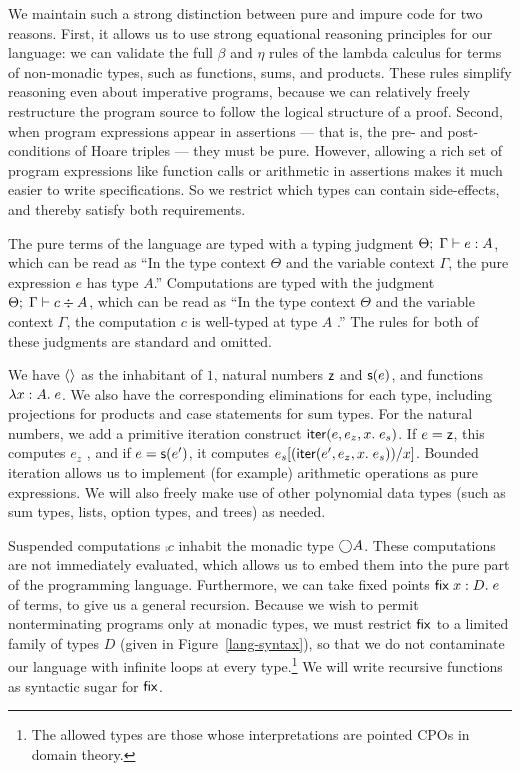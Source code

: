 \documentclass[preprint,natbib]{sigplanconf}
\begin{document}
We maintain such a strong distinction between pure and impure code for
two reasons. First, it allows us to use strong equational reasoning
principles for our language: we can validate the full $\beta$ and
$\eta$ rules of the lambda calculus for terms of non-monadic types,
such as functions, sums, and products. These rules simplify reasoning
even about imperative programs, because we can relatively freely
restructure the program source to follow the logical structure of a
proof. Second, when program expressions appear in assertions --- that
is, the pre- and post-conditions of Hoare triples --- they must be
pure. However, allowing a rich set of program expressions like
function calls or arithmetic in assertions makes it much easier to
write specifications. So we restrict which types can contain
side-effects, and thereby satisfy both requirements.

The pure terms of the language are typed with a typing judgment
${\Theta};\;{\Gamma} \vdash {e} : {A}$, which can be read as ``In the type context
$\Theta$ and the variable context $\Gamma$, the pure expression $e$
has type $A$.'' Computations are typed with the judgment
${\Theta};\;{\Gamma} \vdash {c} \div {A}$, which can be read as ``In the type context
$\Theta$ and the variable context $\Gamma$, the computation $c$ is
well-typed at type $A$ .'' The rules for both of these judgments are
standard and omitted.

We have $\left<\right>$ as the inhabitant of $1$, natural numbers $\mbox{\textsf{{z}}}$ and
$\mbox{\textsf{{s}}}(e)$, and functions $\lambda x:A.\;e$. We also have the corresponding
eliminations for each type, including projections for products and
case statements for sum types. For the natural numbers, we add a
primitive iteration construct $\mbox{\textsf{{iter}}}(e, {e_z}, {x}.\; {e_s})$. If $e = \mbox{\textsf{{z}}}$,
this computes $e_z$ , and if $e = \mbox{\textsf{{s}}}(e')$, it computes
$e_s[(\mbox{\textsf{{iter}}}(e', {e_z}, {x}.\; {e_s}))/x]$. Bounded iteration allows us
to implement (for example) arithmetic operations as pure expressions.
We will also freely make use of other polynomial data types (such as
sum types, lists, option types, and trees) as needed. 

Suspended computations $\comp{c}$ inhabit the monadic type
$\bigcirc{A}$.  These computations are not immediately evaluated, which
allows us to embed them into the pure part of the programming
language. Furthermore, we can take fixed points $\mbox{\textsf{{fix}}}\;{x:D}.\;{e}$ of
terms, to give us a general recursion. Because we wish to permit
nonterminating programs only at monadic types, we must restrict
$\mbox{\textsf{{fix}}}$ to a limited family of types $D$ (given in
Figure~\ref{lang-syntax}), so that we do not contaminate our language
with infinite loops at every type.\footnote{The allowed types are those whose
interpretations are pointed CPOs in domain theory.}  We will
write recursive functions as syntactic sugar for $\mbox{\textsf{{fix}}}$.
\end{document}
